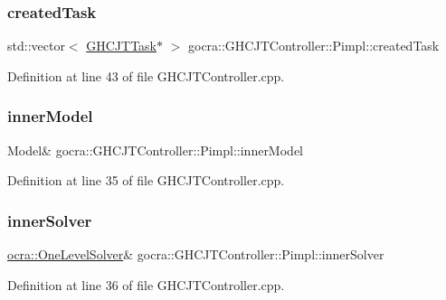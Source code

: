 \subsubsection{\texorpdfstring{created\+Task}{createdTask}}
{\footnotesize\ttfamily std\+::vector$<$ \hyperlink{classgocra_1_1GHCJTTask}{G\+H\+C\+J\+T\+Task}$\ast$ $>$ gocra\+::\+G\+H\+C\+J\+T\+Controller\+::\+Pimpl\+::created\+Task}



Definition at line 43 of file G\+H\+C\+J\+T\+Controller.\+cpp.

\hypertarget{structgocra_1_1GHCJTController_1_1Pimpl_a43eb79ddf7ef332d76d850711fc57e8e}{}\label{structgocra_1_1GHCJTController_1_1Pimpl_a43eb79ddf7ef332d76d850711fc57e8e} 
\subsubsection{\texorpdfstring{inner\+Model}{innerModel}}
{\footnotesize\ttfamily Model\& gocra\+::\+G\+H\+C\+J\+T\+Controller\+::\+Pimpl\+::inner\+Model}



Definition at line 35 of file G\+H\+C\+J\+T\+Controller.\+cpp.

\hypertarget{structgocra_1_1GHCJTController_1_1Pimpl_af06224d9d2a704cb042b5b01d3bf18ab}{}\label{structgocra_1_1GHCJTController_1_1Pimpl_af06224d9d2a704cb042b5b01d3bf18ab} 
\subsubsection{\texorpdfstring{inner\+Solver}{innerSolver}}
{\footnotesize\ttfamily \hyperlink{classocra_1_1OneLevelSolver}{ocra\+::\+One\+Level\+Solver}\& gocra\+::\+G\+H\+C\+J\+T\+Controller\+::\+Pimpl\+::inner\+Solver}



Definition at line 36 of file G\+H\+C\+J\+T\+Controller.\+cpp.

\hypertarget{structgocra_1_1GHCJTController_1_1Pimpl_a04bbff0e011a7c0b2bff47c08ed32993}{}\label{structgocra_1_1GHCJTController_1_1Pimpl_a04bbff0e011a7c0b2bff47c08ed32993} 
